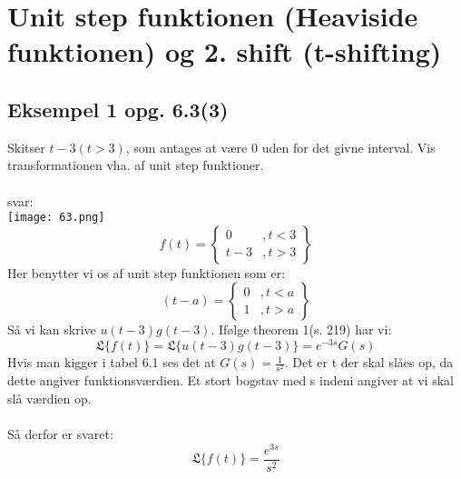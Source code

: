 \documentclass[11pt,fleqn]{book} %
\begin{document}
\section{Unit step funktionen (Heaviside funktionen) og 2. shift (t-shifting)}

\subsection{Eksempel 1 opg. 6.3(3)}
Skitser $t-3(t>3)$, som antages at være 0 uden for det givne interval. Vis transformationen vha. af unit step funktioner. \\\\
svar:\\
\texttt{[image: 63.png]}\\
\begin{equation}
f(t)=\begin{Bmatrix}
0 & , t<3 \\ 
 t-3 & , t>3 
\end{Bmatrix}
\end{equation}
Her benytter vi os af unit step funktionen som er:
\begin{equation}
(t-a)=\begin{Bmatrix}
0 & , t<a \\ 
1 & , t>a
\end{Bmatrix}
\end{equation}
Så vi kan skrive $u(t-3)g(t-3)$. Ifølge theorem 1(s. 219) har vi:
\begin{equation}
\mathfrak{L} \{ f(t)\} =\mathfrak{L} \{ u(t-3)g(t-3)  \}=e^{-3s} G(s)
\end{equation}
Hvis man kigger i tabel 6.1  ses det at $G(s)=\frac{1}{s^2}$. Det er t der skal slåes op, da dette angiver funktionsværdien. Et stort bogstav med s indeni angiver at vi skal slå værdien op.\\\\
Så derfor er svaret:
\begin{equation}
\mathfrak{L} \{ f(t) \} = \frac{e^{3s}}{s^2}
\end{equation}
\end{document}
